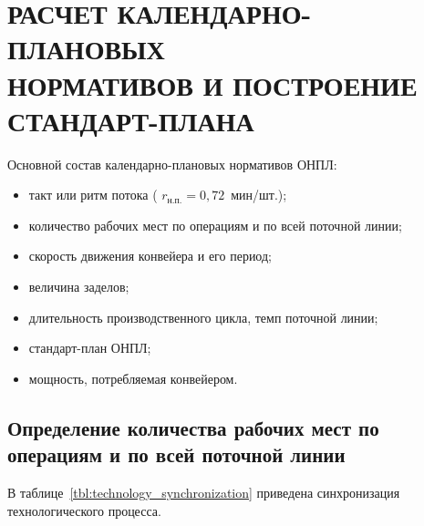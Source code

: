 \section[%
Расчет календарно-плановых нормативов и построение стандарт-плана]{
РАСЧЕТ КАЛЕНДАРНО-ПЛАНОВЫХ \\
НОРМАТИВОВ И ПОСТРОЕНИЕ \\
СТАНДАРТ-ПЛАНА
}
\label{sec:kpn}

Основной состав календарно-плановых нормативов ОНПЛ:
\begin{itemize}
  \item такт или ритм потока ( $r_{\text{н.п.}} = 0{,}72$~мин/шт.);
  \item количество рабочих мест по операциям и по всей поточной линии;
  \item скорость движения конвейера и его период;
  \item величина заделов;
  \item длительность производственного цикла, темп поточной линии;
  \item стандарт-план ОНПЛ;
  \item мощность, потребляемая конвейером.
\end{itemize}

\subsection{Определение количества рабочих мест по операциям и по всей поточной линии}
\label{subsec:number_of_employees_calculation}

В таблице~\ref{tbl:technology_synchronization} приведена синхронизация технологического
процесса.


